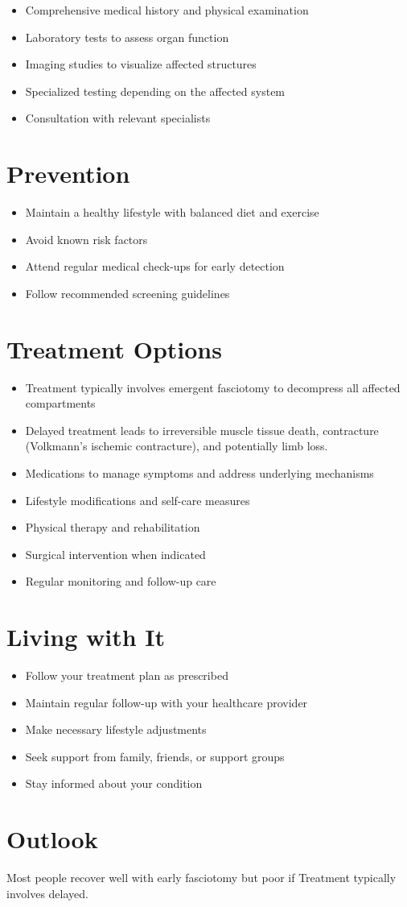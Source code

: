 \begin{itemize}[noitemsep]
  \item Comprehensive medical history and physical examination
  \item Laboratory tests to assess organ function
  \item Imaging studies to visualize affected structures
  \item Specialized testing depending on the affected system
  \item Consultation with relevant specialists
\end{itemize}
\section{Prevention}
\begin{itemize}[noitemsep]
  \item Maintain a healthy lifestyle with balanced diet and exercise
  \item Avoid known risk factors
  \item Attend regular medical check-ups for early detection
  \item Follow recommended screening guidelines
\end{itemize}
\section{Treatment Options}
\begin{itemize}[noitemsep]
  \item Treatment typically involves emergent fasciotomy to decompress all affected compartments
  \item Delayed treatment leads to irreversible muscle tissue death, contracture (Volkmann's ischemic contracture), and potentially limb loss.
  \item Medications to manage symptoms and address underlying mechanisms
  \item Lifestyle modifications and self-care measures
  \item Physical therapy and rehabilitation
  \item Surgical intervention when indicated
  \item Regular monitoring and follow-up care
\end{itemize}
\section{Living with It}
\begin{itemize}[noitemsep]
  \item Follow your treatment plan as prescribed
  \item Maintain regular follow-up with your healthcare provider
  \item Make necessary lifestyle adjustments
  \item Seek support from family, friends, or support groups
  \item Stay informed about your condition
\end{itemize}
\section{Outlook}
Most people recover well with early fasciotomy but poor if Treatment typically involves delayed.
